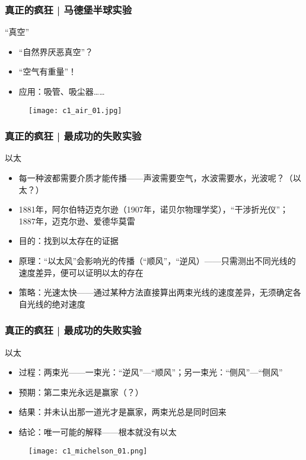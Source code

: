 \begin{frame}
  \frametitle{真正的疯狂 | 马德堡半球实验}
  \begin{block}{“真空”}
    \begin{itemize}
      \item “自然界厌恶真空”？
      \item “空气有重量”！
      \item 应用：吸管、吸尘器……
    \end{itemize}
  \begin{figure}
    \centering
    \texttt{[image: c1\_air\_01.jpg]}
  \end{figure}
  \end{block}
\end{frame}

\begin{frame}
  \frametitle{真正的疯狂 | 最成功的失败实验}
  \begin{block}{以太}
    \begin{itemize}
      \item 每一种波都需要介质才能传播——声波需要空气，水波需要水，光波呢？（以太？）
      \item 1881年，阿尔伯特\textbullet 迈克尔逊（1907年，诺贝尔物理学奖），“干涉折光仪”；1887年，迈克尔逊、爱德华\textbullet 莫雷
      \item 目的：找到以太存在的证据
      \item 原理：“以太风”会影响光的传播（“顺风”，“逆风）——只需测出不同光线的速度差异，便可以证明以太的存在
      \item 策略：光速太快——通过某种方法直接算出两束光线的速度差异，无须确定各自光线的绝对速度
    \end{itemize}
  \end{block}
\end{frame}

\begin{frame}
  \frametitle{真正的疯狂 | 最成功的失败实验}
  \begin{block}{以太}
    \begin{itemize}
      \item 过程：两束光——一束光：“逆风”—“顺风”；另一束光：“侧风”—“侧风”
      \item 预期：第二束光永远是赢家（？）
      \item 结果：并未认出那一道光才是赢家，两束光总是同时回来
      \item 结论：唯一可能的解释——根本就没有以太
    \end{itemize}
  \end{block}
  \vspace{-0.5em}
  \begin{figure}
    \centering
    \texttt{[image: c1\_michelson\_01.png]}
  \end{figure}
\end{frame}

